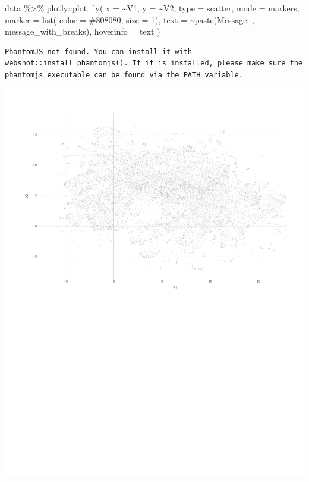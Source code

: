 \documentclass[
  letterpaper,
  DIV=11,
  numbers=noendperiod]{scrreprt}
\newenvironment{Shaded}{\begin{snugshade}}{\end{snugshade}}
\newcommand{\AttributeTok}[1]{\textcolor[rgb]{0.40,0.45,0.13}{#1}}
\newcommand{\DecValTok}[1]{\textcolor[rgb]{0.68,0.00,0.00}{#1}}
\newcommand{\FunctionTok}[1]{\textcolor[rgb]{0.28,0.35,0.67}{#1}}
\newcommand{\NormalTok}[1]{\textcolor[rgb]{0.00,0.23,0.31}{#1}}
\newcommand{\SpecialCharTok}[1]{\textcolor[rgb]{0.37,0.37,0.37}{#1}}
\newcommand{\StringTok}[1]{\textcolor[rgb]{0.13,0.47,0.30}{#1}}
\begin{document}
\begin{Shaded}
\begin{Highlighting}[]
\NormalTok{data }\SpecialCharTok{\%\textgreater{}\%}\NormalTok{ plotly}\SpecialCharTok{::}\FunctionTok{plot\_ly}\NormalTok{(}
  \AttributeTok{x =} \SpecialCharTok{\textasciitilde{}}\NormalTok{V1,}
  \AttributeTok{y =} \SpecialCharTok{\textasciitilde{}}\NormalTok{V2,}
  \AttributeTok{type =} \StringTok{\textquotesingle{}scatter\textquotesingle{}}\NormalTok{,}
  \AttributeTok{mode =} \StringTok{\textquotesingle{}markers\textquotesingle{}}\NormalTok{,}
  \AttributeTok{marker =} \FunctionTok{list}\NormalTok{( }\AttributeTok{color =} \StringTok{\textquotesingle{}\#808080\textquotesingle{}}\NormalTok{, }\AttributeTok{size =} \DecValTok{1}\NormalTok{),}
  \AttributeTok{text =} \SpecialCharTok{\textasciitilde{}}\FunctionTok{paste}\NormalTok{(}\StringTok{\textquotesingle{}Message: \textquotesingle{}}\NormalTok{, message\_with\_breaks),}
  \AttributeTok{hoverinfo =} \StringTok{\textquotesingle{}text\textquotesingle{}}
\NormalTok{)}
\end{Highlighting}
\end{Shaded}

\begin{verbatim}
PhantomJS not found. You can install it with webshot::install_phantomjs(). If it is installed, please make sure the phantomjs executable can be found via the PATH variable.
\end{verbatim}

\includegraphics{conversation_landscape_files/figure-pdf/unnamed-chunk-3-1.pdf}
\end{document}
